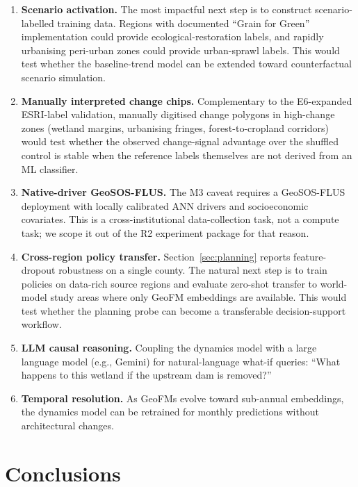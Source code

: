 \documentclass{article}
\begin{document}
\begin{enumerate}
\item \textbf{Scenario activation.} The most impactful next step is to construct scenario-labelled training data. Regions with documented ``Grain for Green'' implementation could provide ecological-restoration labels, and rapidly urbanising peri-urban zones could provide urban-sprawl labels. This would test whether the baseline-trend model can be extended toward counterfactual scenario simulation.

\item \textbf{Manually interpreted change chips.} Complementary to the E6-expanded ESRI-label validation, manually digitised change polygons in high-change zones (wetland margins, urbanising fringes, forest-to-cropland corridors) would test whether the observed change-signal advantage over the shuffled control is stable when the reference labels themselves are not derived from an ML classifier.

\item \textbf{Native-driver GeoSOS-FLUS.} The M3 caveat requires a GeoSOS-FLUS deployment with locally calibrated ANN drivers and socioeconomic covariates. This is a cross-institutional data-collection task, not a compute task; we scope it out of the R2 experiment package for that reason.

\item \textbf{Cross-region policy transfer.} Section~\ref{sec:planning} reports feature-dropout robustness on a single county. The natural next step is to train policies on data-rich source regions and evaluate zero-shot transfer to world-model study areas where only GeoFM embeddings are available. This would test whether the planning probe can become a transferable decision-support workflow.

\item \textbf{LLM causal reasoning.} Coupling the dynamics model with a large language model (e.g., Gemini) for natural-language what-if queries: ``What happens to this wetland if the upstream dam is removed?''

\item \textbf{Temporal resolution.} As GeoFMs evolve toward sub-annual embeddings, the dynamics model can be retrained for monthly predictions without architectural changes.
\end{enumerate}

\section{Conclusions}
\label{sec:conclusions}
\end{document}
